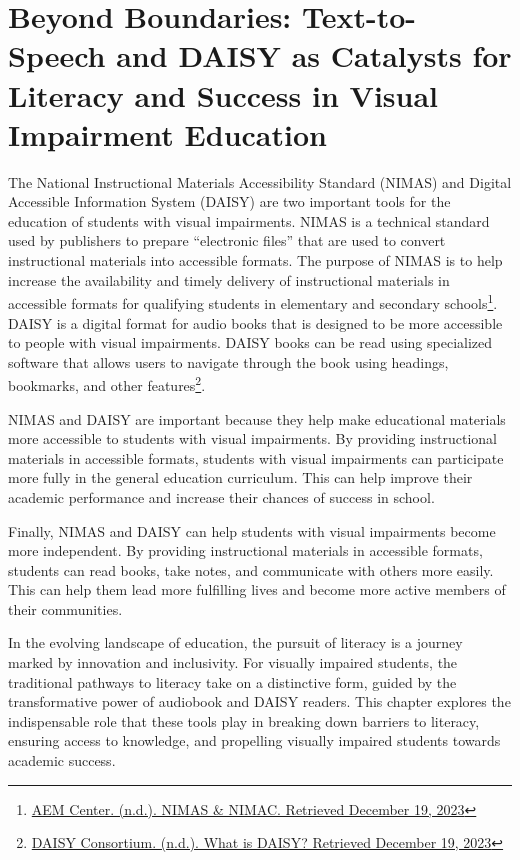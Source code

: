\chapter{Beyond Boundaries: Text-to-Speech and DAISY as Catalysts for Literacy and Success in Visual Impairment Education}\label{audio}

The National Instructional Materials Accessibility Standard (NIMAS) and Digital Accessible Information System (DAISY) are two important tools for the education of students with visual impairments. NIMAS is a technical standard used by publishers to prepare “electronic files” that are used to convert instructional materials into accessible formats. The purpose of NIMAS is to help increase the availability and timely delivery of instructional materials in accessible formats for qualifying students in elementary and secondary schools\footnote{\href{https://aem.cast.org/nimas-nimac/nimas-nimac}{AEM Center. (n.d.). NIMAS \& NIMAC. Retrieved December 19, 2023}}. DAISY is a digital format for audio books that is designed to be more accessible to people with visual impairments. DAISY books can be read using specialized software that allows users to navigate through the book using headings, bookmarks, and other features\footnote{\href{https://daisy.org/about_us/what-is-daisy/}{DAISY Consortium. (n.d.). What is DAISY? Retrieved December 19, 2023}}.

NIMAS and DAISY are important because they help make educational materials more accessible to students with visual impairments. By providing instructional materials in accessible formats, students with visual impairments can participate more fully in the general education curriculum. This can help improve their academic performance and increase their chances of success in school.

Finally, NIMAS and DAISY can help students with visual impairments become more independent. By providing instructional materials in accessible formats, students can read books, take notes, and communicate with others more easily. This can help them lead more fulfilling lives and become more active members of their communities.

In the evolving landscape of education, the pursuit of literacy is a journey marked by innovation and inclusivity. For visually impaired students, the traditional pathways to literacy take on a distinctive form, guided by the transformative power of audiobook and DAISY readers. This chapter explores the indispensable role that these tools play in breaking down barriers to literacy, ensuring access to knowledge, and propelling visually impaired students towards academic success.

